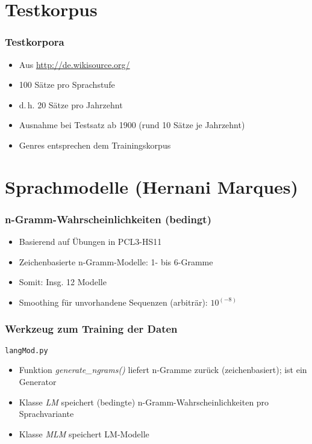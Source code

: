 \documentclass[t]{beamer} %
\begin{document}
\section{Testkorpus}

\begin{frame}
  \frametitle{Testkorpora}
  \begin{itemize}
  \item Aus \url{http://de.wikisource.org/}\pause
  \vspace*{1ex}
  \item 100 Sätze pro Sprachstufe\pause
  \item d.\,h. 20 Sätze pro Jahrzehnt\pause
  \item Ausnahme bei Testsatz ab 1900 (rund 10 Sätze je Jahrzehnt)\pause
  \vspace*{1ex}
  \item Genres entsprechen dem Trainingskorpus
  \end{itemize}  
\end{frame}

\section{Sprachmodelle (Hernani Marques)}

\begin{frame}
  \frametitle{n-Gramm-Wahrscheinlichkeiten (bedingt)}
  \begin{itemize}
  \item Basierend auf Übungen in PCL3-HS11\pause
  \vspace*{1ex}
  \item Zeichenbasierte n-Gramm-Modelle: 1- bis 6-Gramme\pause
  \item Somit: Insg. 12 Modelle \pause
  \item Smoothing für unvorhandene Sequenzen (arbiträr): $10^(-8)$
  \vspace*{1ex}
  \end{itemize}  
\end{frame}

% 
\begin{frame}
  \frametitle{Werkzeug zum Training der Daten}
  \texttt{langMod.py}
  \begin{itemize}
  \item Funktion \emph{generate\_ngrams()} liefert n-Gramme zurück (zeichenbasiert); ist ein Generator
  \item Klasse \emph{LM} speichert (bedingte) n-Gramm-Wahrscheinlichkeiten pro Sprachvariante\pause
  \item Klasse \emph{MLM} speichert LM-Modelle
  \vspace*{1ex}
  \end{itemize}  
\end{frame}
\end{document}
